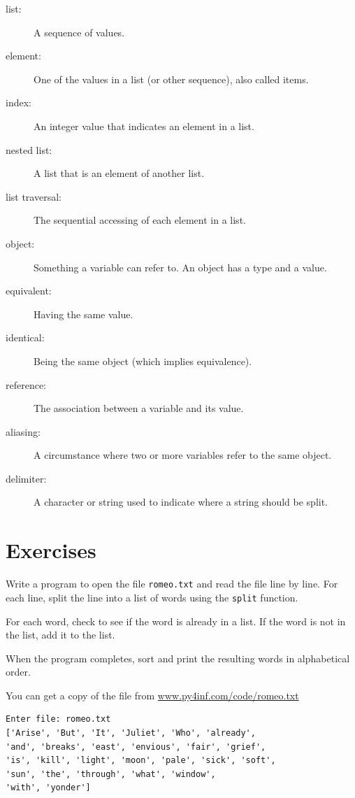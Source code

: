 \documentclass[10pt]{book}
\begin{document}
\begin{description}

\item[list:] A sequence of values.

\item[element:] One of the values in a list (or other sequence),
also called items.

\item[index:] An integer value that indicates an element in a list.

\item[nested list:] A list that is an element of another list.

\item[list traversal:] The sequential accessing of each element in a list.

\item[object:] Something a variable can refer to.  An object
has a type and a value.

\item[equivalent:] Having the same value.

\item[identical:] Being the same object (which implies equivalence).

\item[reference:] The association between a variable and its value.

\item[aliasing:] A circumstance where two or more variables refer to the same
object.

\item[delimiter:] A character or string used to indicate where a
string should be split.

\end{description}


\section{Exercises}

\begin{ex}
Write a program to open the file {\tt romeo.txt} and read the file
line by line.  For each line, split the line into  a list of 
words using the {\tt split} function.

For each word, check to see if the word is already in a list.  
If the word is not in the list, add it to the list.  

When the program completes, sort and print the resulting words
in alphabetical order.

You can get a copy of the file from 
\url{www.py4inf.com/code/romeo.txt}

\begin{verbatim}
Enter file: romeo.txt
['Arise', 'But', 'It', 'Juliet', 'Who', 'already', 
'and', 'breaks', 'east', 'envious', 'fair', 'grief', 
'is', 'kill', 'light', 'moon', 'pale', 'sick', 'soft', 
'sun', 'the', 'through', 'what', 'window', 
'with', 'yonder']
\end{verbatim}
\end{ex}
\end{document}
